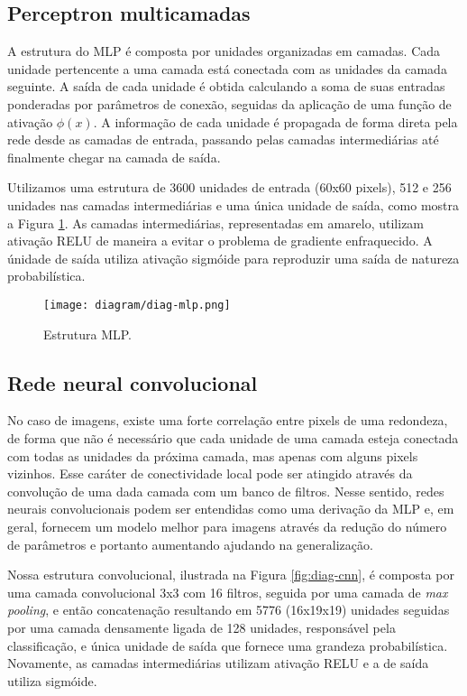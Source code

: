     \subsection{Perceptron multicamadas}
        A estrutura do MLP é composta por unidades organizadas em camadas. Cada unidade pertencente a uma camada está conectada com as unidades da camada seguinte. A saída de cada unidade é obtida calculando a soma de suas entradas ponderadas por parâmetros de conexão, seguidas da aplicação de uma função de ativação $\phi(x)$. A informação de cada unidade é propagada de forma direta pela rede desde as camadas de entrada, passando pelas camadas intermediárias até finalmente chegar na camada de saída.

        Utilizamos uma estrutura de 3600 unidades de entrada (60x60 pixels), 512 e 256 unidades nas camadas intermediárias e uma única unidade de saída, como mostra a Figura \ref{fig:diag-mlp}. As camadas intermediárias, representadas em amarelo, utilizam ativação RELU \cite{nair2010relu} de maneira a evitar o problema de gradiente enfraquecido. A únidade de saída utiliza ativação sigmóide para reproduzir uma saída de natureza probabilística.

        \begin{figure}
        \centering
        \texttt{[image: diagram/diag-mlp.png]}
        \caption{Estrutura MLP.}
        \label{fig:diag-mlp}
        \end{figure}

    \subsection{Rede neural convolucional}
         No caso de imagens, existe uma forte correlação entre pixels de uma redondeza, de forma que não é necessário que cada unidade de uma camada esteja conectada com todas as unidades da próxima camada, mas apenas com alguns pixels vizinhos. Esse caráter de conectividade local pode ser atingido através da convolução de uma dada camada com um banco de filtros. Nesse sentido, redes neurais convolucionais podem ser entendidas como uma derivação da MLP e, em geral, fornecem um modelo melhor para imagens através da redução do número de parâmetros e portanto aumentando ajudando na generalização.

         Nossa estrutura convolucional, ilustrada na Figura \ref{fig:diag-cnn}, é composta por uma camada convolucional 3x3 com 16 filtros, seguida por uma camada de \textit{max pooling}, e então concatenação resultando em 5776 (16x19x19) unidades seguidas por uma camada densamente ligada de 128 unidades, responsável pela classificação, e única unidade de saída que fornece uma grandeza probabilística. Novamente, as camadas intermediárias utilizam ativação RELU e a de saída utiliza sigmóide.

